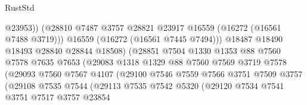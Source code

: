 \begin{lexlean}{RustStd}
\begin{coremodule}
                                        @23953))
                                    (@28810
                                      @7487
                                      @3757
                                      @28821
                                      @23917
                                      @16559
                                      (@16272 (@16561 @7488 @3719)))
                                    @16559
                                    (@16272 (@16561 @7445 @7494)))
                                  @18487
                                  @18490
                                  @18493
                                  @28840
                                  @28844
                                  @18508)
                                (@28851
                                  @7504
                                  @1330
                                  @1353
                                  @88
                                  @7560
                                  @7578
                                  @7635
                                  @7653
                                  (@29083
                                    @1318
                                    @1329
                                    @88
                                    @7560
                                    @7569
                                    @3719
                                    @7578
                                    (@29093
                                      @7560
                                      @7567
                                      @4107
                                      (@29100
                                        @7546
                                        @7559
                                        @7566
                                        @3751
                                        @7509
                                        @3757
                                        (@29108
                                          @7535
                                          @7544
                                          (@29113
                                            @7535
                                            @7542
                                            @5320
                                            (@29120
                                              @7534
                                              @7541
                                              @3751
                                              @7517
                                              @3757
                                              @23854

\end{coremodule}
\end{lexlean}
